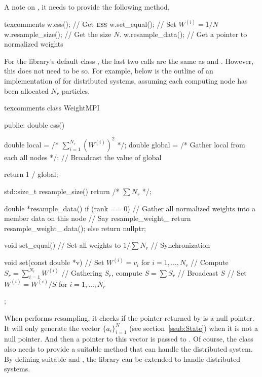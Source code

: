 A note on , it needs to provide the following method,
\begin{cppcode*}{texcomments}
  w.ess();           // Get $\text{\normalfont\textsc{ess}}$
  w.set_equal();     // Set $W^{(i)} = 1/N$
  w.resample_size(); // Get the size $N$.
  w.resample_data(); // Get a pointer to normalized weights
\end{cppcode*}
For the library's default class , the last two calls are the
same as  and . However, this does not
need to be so. For example, below is the outline of an implementation of
 for distributed systems, assuming each computing node
has been allocated $N_r$ particles.
\begin{cppcode*}{texcomments}
  class WeightMPI
  {
      public:
      double ess()
      {
          double local = /* $\sum_{i=1}^{N_r}(W^{(i)})^2$ */;
          double global = /* Gather local from each all nodes */;
          // Broadcast the value of global

          return 1 / global;
      }

      std::size_t resample_size() { return /* $\sum N_r$ */; }

      double *resample_data()
      {
          if (rank == 0) {
              // Gather all normalized weights into a member data on this node
              // Say resample\_weight\_
              return resample_weight_.data();
          } else {
              return nullptr;
          }
      }

      void set_equal()
      {
          // Set all weights to $1 / \sum N_r$
          // Synchronization
      }

      void set(const double *v)
      {
          // Set $W^{(i)} = v_i$ for $i = 1,\dots,N_r$
          // Compute $S_r = \sum_{i=1}^{N_r} W^{(i)}$
          // Gathering $S_r$, compute $S = \sum S_r$
          // Broadcast $S$
          // Set $W^{(i)} = W^{(i)} / S$ for $i = 1,\dots,N_r$
      }
  };
\end{cppcode*}
When  performs resampling, it checks if the pointer
returned by  is a null pointer. It will only
generate the vector $\{a_i\}_{i=1}^N$ (see section~\ref{ssub:State}) when it is
not a null pointer. And then a pointer to this vector is passed to
. Of course, the class  also needs to provide a
suitable method  that can handle the distributed system. By
defining suitable  and , the library
can be extended to handle distributed systems.


